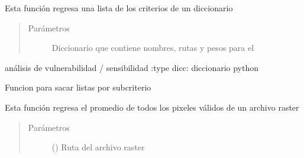 \documentclass[letterpaper,10pt,spanish]{sphinxmanual}
\begin{document}
\begin{fulllineitems}
\label{\detokenize{analisis:sensibilidad_por_remocion_capas.lista_criterios}}
Esta función regresa una lista de los criterios de un diccionario
\begin{quote}\begin{description}
\item[{Parámetros}] \leavevmode
{} \textendash{} Diccionario que contiene nombres, rutas y pesos para el

\end{description}\end{quote}

análisis de vulnerabilidad / sensibilidad
:type dicc: diccionario python

\end{fulllineitems}


\begin{fulllineitems}
\label{\detokenize{analisis:sensibilidad_por_remocion_capas.lista_pesos_ruta}}
Funcion para sacar listas por subcriterio

\end{fulllineitems}


\begin{fulllineitems}
\label{\detokenize{analisis:sensibilidad_por_remocion_capas.media_raster}}
Esta función regresa el promedio de todos los pixeles válidos
de un archivo raster
\begin{quote}\begin{description}
\item[{Parámetros}] \leavevmode
{} () \textendash{} Ruta del archivo raster

\end{description}\end{quote}

\end{fulllineitems}
\end{document}

